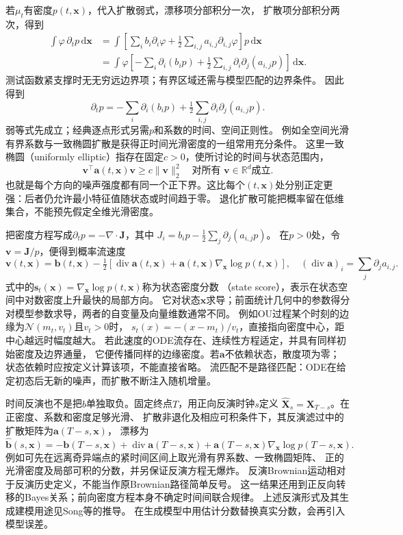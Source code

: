 若$\mu_t$有密度$p(t,\bm x)$，代入扩散弱式，漂移项分部积分一次，
扩散项分部积分两次，得到
\begin{align*}
 \int\varphi\,\partial_t p\,\mathrm d\bm x
  &=\int\left[\sum_i b_i\partial_i\varphi
            +\tfrac12\sum_{i,j}a_{i,j}\partial_{i,j}\varphi\right]p\,\mathrm d\bm x\\
  &=\int\varphi\left[-\sum_i\partial_i(b_ip)
           +\tfrac12\sum_{i,j}\partial_i\partial_j(a_{i,j}p)\right]\,\mathrm d\bm x .
\end{align*}
测试函数紧支撑时无无穷远边界项；有界区域还需与模型匹配的边界条件。
因此得到
\begin{equation}
 \partial_t p=-\sum_i\partial_i(b_ip)
                  +\tfrac12\sum_{i,j}\partial_i\partial_j(a_{i,j}p).
 \label{eq:dynamical-fokker-planck}
\end{equation}
弱等式先成立；经典逐点形式另需$p$和系数的时间、空间正则性。
例如全空间光滑有界系数与一致椭圆扩散是获得正时间光滑密度的一组常用充分条件。
这里一致椭圆（uniformly elliptic）指存在固定$c>0$，使所讨论的时间与状态范围内，
\[
 \bm v^\top\bm a(t,\bm x)\bm v\geq c\|\bm v\|_2^2
 \quad\text{对所有 }\bm v\in\mathbb R^d\text{成立}.
\]
也就是每个方向的噪声强度都有同一个正下界。这比每个$(t,\bm x)$处分别正定更强：后者仍允许最小特征值随状态或时间趋于零。
退化扩散可能把概率留在低维集合，不能预先假定全维光滑密度。

把密度方程写成$\partial_t p=-\nabla\cdot\bm J$，其中
$J_i=b_ip-\frac12\sum_j\partial_j(a_{i,j}p)$。
在$p>0$处，令$\bm v=\bm J/p$，便得到概率流速度
\begin{equation}
 \bm v(t,\bm x)=\bm b(t,\bm x)
   -\tfrac12[\operatorname{div}\bm a(t,\bm x)
                         +\bm a(t,\bm x)\nabla_{\bm x}\log p(t,\bm x)],
 \quad
 (\operatorname{div}\bm a)_i=\sum_j\partial_j a_{i,j}.
 \label{eq:action-state-probability-flow}
\end{equation}
式中的$\bm s_t(\bm x)=\nabla_{\bm x}\log p(t,\bm x)$称为状态密度分数
（state score），表示在状态空间中对数密度上升最快的局部方向。
它对状态$\bm x$求导；前面统计几何中的参数得分对模型参数求导，两者的自变量及向量维数通常不同。
例如OU过程某个时刻的边缘为$\mathcal N(m_t,v_t)$且$v_t>0$时，
$s_t(x)=-(x-m_t)/v_t$，直接指向密度中心，距中心越远时幅度越大。
若此速度的ODE流存在、连续性方程适定，并具有同样初始密度及边界通量，
它便传播同样的边缘密度。若$\bm a$不依赖状态，散度项为零；
状态依赖时应按定义计算该项，不能直接省略。
流匹配不是路径匹配：ODE在给定初态后无新的噪声，而扩散不断注入随机增量。

时间反演也不是把$b$单独取负。固定终点$T$，用正向反演时钟$s$定义
$\widehat{\bm X}_s=\bm X_{T-s}$。在正密度、系数和密度足够光滑、
扩散非退化及相应可积条件下，其反演滤过中的扩散矩阵为$\bm a(T-s,\bm x)$，
漂移为
\[
 \widehat{\bm b}(s,\bm x)
    =-\bm b(T-s,\bm x)+\operatorname{div}\bm a(T-s,\bm x)
                  +\bm a(T-s,\bm x)\nabla_{\bm x}\log p(T-s,\bm x).
\]
例如可先在远离奇异端点的紧时间区间上取光滑有界系数、一致椭圆矩阵、
正的光滑密度及局部可积的分数，并另保证反演方程无爆炸。
反演Brownian运动相对于反演历史定义，不能当作原Brownian路径简单反号。
这一结果还用到正反向转移的Bayes关系；前向密度方程本身不确定时间间联合规律。
上述反演形式及其生成建模用途见Song等的推导。
在生成模型中用估计分数替换真实分数，会再引入模型误差。

